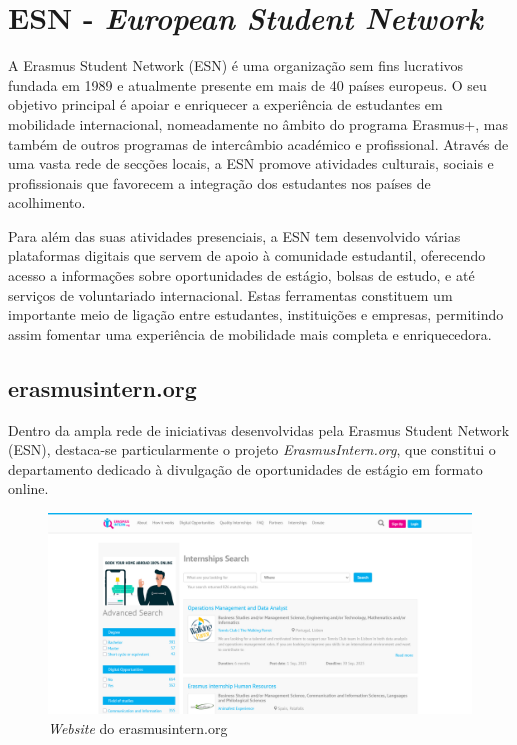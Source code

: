 \section{ESN - \textit{European Student Network}}

A Erasmus Student Network (ESN) é uma organização sem fins lucrativos fundada em 1989 e atualmente presente em mais de 40 países europeus. O seu objetivo principal é apoiar e enriquecer a experiência de estudantes em mobilidade internacional, nomeadamente no âmbito do programa Erasmus+, mas também de outros programas de intercâmbio académico e profissional. Através de uma vasta rede de secções locais, a ESN promove atividades culturais, sociais e profissionais que favorecem a integração dos estudantes nos países de acolhimento.

Para além das suas atividades presenciais, a ESN tem desenvolvido várias plataformas digitais que servem de apoio à comunidade estudantil, oferecendo acesso a informações sobre oportunidades de estágio, bolsas de estudo, e até serviços de voluntariado internacional. Estas ferramentas constituem um importante meio de ligação entre estudantes, instituições e empresas, permitindo assim fomentar uma experiência de mobilidade mais completa e enriquecedora.

\subsection{erasmusintern.org}

Dentro da ampla rede de iniciativas desenvolvidas pela Erasmus Student Network (ESN), destaca-se particularmente o projeto \textit{ErasmusIntern.org}, que constitui o departamento dedicado à divulgação de oportunidades de estágio em formato online.

\begin{figure}[h!tbp]
    \centering
    \includegraphics[width=0.7\linewidth]{capitulos/cap2-estadodaarte/assets/image/esn/internship-org.png}
    \caption{\textit{Website} do erasmusintern.org}
    \label{fig:erasmus-intern-homepage}
\end{figure}

